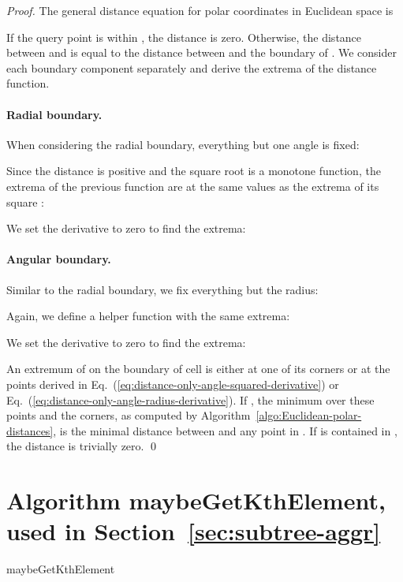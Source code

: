 \documentclass{llncs}
\begin{document}
\begin{proof}
The general distance equation for polar coordinates in Euclidean space is


If the query point  is within , the distance is zero.
Otherwise, the distance between  and  is equal to the distance between  and the boundary of .
We consider each boundary component separately and derive the extrema of the distance function.

\paragraph{Radial boundary.}
When considering the radial boundary, everything but one angle is fixed:

Since the distance is positive and the square root is a monotone function, the extrema of the previous function are at the same values as the extrema of its square :

We set the derivative to zero to find the extrema:


\paragraph{Angular boundary.}
Similar to the radial boundary, we fix everything but the radius:


Again, we define a helper function with the same extrema:

We set the derivative to zero to find the extrema:


An extremum of  on the boundary of cell  is either at one of its corners or at the points derived in Eq.~(\ref{eq:distance-only-angle-squared-derivative}) or Eq.~(\ref{eq:distance-only-angle-radius-derivative}).
If , the minimum over these points and the corners, as computed by Algorithm~\ref{algo:Euclidean-polar-distances}, is the minimal distance between  and any point in .
If  is contained in , the distance is trivially zero.
\qed
\end{proof}

\pagebreak

\section{Algorithm maybeGetKthElement, used in Section~\ref{sec:subtree-aggr}}
\label{sec:maybe-get-kth-element}
\begin{algorithm}[H]
 \caption{maybeGetKthElement}
 \label{algo:maybe-get-kth-element}
\end{algorithm}
\clearpage
\end{document}
